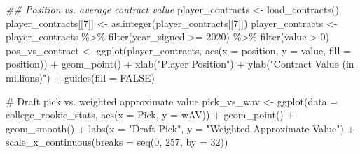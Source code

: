 \documentclass[
  letterpaper,
  DIV=11,
  numbers=noendperiod]{scrartcl}
\newenvironment{Shaded}{\begin{snugshade}}{\end{snugshade}}
\newcommand{\AttributeTok}[1]{\textcolor[rgb]{0.40,0.45,0.13}{#1}}
\newcommand{\CommentTok}[1]{\textcolor[rgb]{0.37,0.37,0.37}{#1}}
\newcommand{\ConstantTok}[1]{\textcolor[rgb]{0.56,0.35,0.01}{#1}}
\newcommand{\DecValTok}[1]{\textcolor[rgb]{0.68,0.00,0.00}{#1}}
\newcommand{\DocumentationTok}[1]{\textcolor[rgb]{0.37,0.37,0.37}{\textit{#1}}}
\newcommand{\FunctionTok}[1]{\textcolor[rgb]{0.28,0.35,0.67}{#1}}
\newcommand{\NormalTok}[1]{\textcolor[rgb]{0.00,0.23,0.31}{#1}}
\newcommand{\OtherTok}[1]{\textcolor[rgb]{0.00,0.23,0.31}{#1}}
\newcommand{\SpecialCharTok}[1]{\textcolor[rgb]{0.37,0.37,0.37}{#1}}
\newcommand{\StringTok}[1]{\textcolor[rgb]{0.13,0.47,0.30}{#1}}
\begin{document}
\begin{Shaded}
\begin{Highlighting}[]
\DocumentationTok{\#\# Position vs. average contract value}
\NormalTok{player\_contracts }\OtherTok{\textless{}{-}} \FunctionTok{load\_contracts}\NormalTok{()}
\NormalTok{player\_contracts[[}\DecValTok{7}\NormalTok{]] }\OtherTok{\textless{}{-}} \FunctionTok{as.integer}\NormalTok{(player\_contracts[[}\DecValTok{7}\NormalTok{]])}
\NormalTok{player\_contracts }\OtherTok{\textless{}{-}}\NormalTok{ player\_contracts }\SpecialCharTok{\%\textgreater{}\%}
  \FunctionTok{filter}\NormalTok{(year\_signed }\SpecialCharTok{\textgreater{}=} \DecValTok{2020}\NormalTok{) }\SpecialCharTok{\%\textgreater{}\%}
  \FunctionTok{filter}\NormalTok{(value }\SpecialCharTok{\textgreater{}} \DecValTok{0}\NormalTok{)}
\NormalTok{pos\_vs\_contract }\OtherTok{\textless{}{-}} \FunctionTok{ggplot}\NormalTok{(player\_contracts, }\FunctionTok{aes}\NormalTok{(}\AttributeTok{x =}\NormalTok{ position, }\AttributeTok{y =}\NormalTok{ value, }\AttributeTok{fill =}\NormalTok{ position)) }\SpecialCharTok{+}
  \FunctionTok{geom\_point}\NormalTok{() }\SpecialCharTok{+}
  \FunctionTok{xlab}\NormalTok{(}\StringTok{"Player Position"}\NormalTok{) }\SpecialCharTok{+}
  \FunctionTok{ylab}\NormalTok{(}\StringTok{"Contract Value (in millions)"}\NormalTok{) }\SpecialCharTok{+}
  \FunctionTok{guides}\NormalTok{(}\AttributeTok{fill =} \ConstantTok{FALSE}\NormalTok{)}

\CommentTok{\# Draft pick vs. weighted approximate value}
\NormalTok{pick\_vs\_wav }\OtherTok{\textless{}{-}} \FunctionTok{ggplot}\NormalTok{(}\AttributeTok{data =}\NormalTok{ college\_rookie\_stats, }\FunctionTok{aes}\NormalTok{(}\AttributeTok{x =}\NormalTok{ Pick, }\AttributeTok{y =}\NormalTok{ wAV)) }\SpecialCharTok{+} 
  \FunctionTok{geom\_point}\NormalTok{() }\SpecialCharTok{+} 
  \FunctionTok{geom\_smooth}\NormalTok{() }\SpecialCharTok{+}
  \FunctionTok{labs}\NormalTok{(}\AttributeTok{x =} \StringTok{"Draft Pick"}\NormalTok{, }\AttributeTok{y =} \StringTok{"Weighted Approximate Value"}\NormalTok{) }\SpecialCharTok{+}
  \FunctionTok{scale\_x\_continuous}\NormalTok{(}\AttributeTok{breaks =} \FunctionTok{seq}\NormalTok{(}\DecValTok{0}\NormalTok{, }\DecValTok{257}\NormalTok{, }\AttributeTok{by =} \DecValTok{32}\NormalTok{))}


\end{Highlighting}
\end{Shaded}
\end{document}
